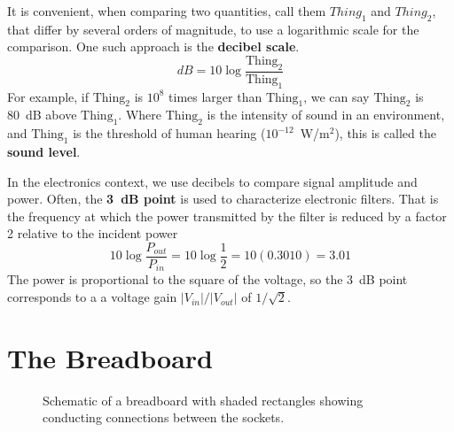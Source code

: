 \documentclass[11pt]{article}
\begin{document}
It is convenient, when comparing two quantities, call them $Thing_1$ 
and $Thing_2$, that differ by several orders of magnitude, to use a
logarithmic scale for the comparison. One such approach is the
\textbf{decibel scale}.
\begin{equation}
  dB = 10 \log \frac{\mathrm{Thing_2}}{\mathrm{Thing_1}}
  \label{eq:db}
\end{equation}
For example, if $\mathrm{Thing_2}$ is $10^8$ times larger than
$\mathrm{Thing_1}$, we can say $\mathrm{Thing_2}$ is 80~dB above
$\mathrm{Thing_1}$. Where $\mathrm{Thing_2}$ is the intensity
of sound in an environment, and $\mathrm{Thing_1}$ is the threshold of
human hearing ($10^{-12}$~W/m$^2$), this is called the
\textbf{sound level}.

In the electronics  context, we use decibels to compare signal
amplitude and power. Often, the \textbf{3~dB point} is used to characterize 
electronic filters. That is the frequency at which the power
transmitted by the filter is reduced by a factor 2 relative to the
incident power 
\[
10 \log \frac{P_{out}}{P_{in}} = 10 \log \frac{1}{2} = 10 (0.3010) = 3.01
\]
The power is proportional to the square of the voltage, so the 3~dB
point corresponds to a a voltage gain $|V_{in}|/|V_{out}|$ of
$1/\sqrt{2}$. 

\section{The Breadboard}
\label{sec:breadboard}

\begin{figure}[ht]
  \begin{center}
    \caption{Schematic of a breadboard with shaded rectangles showing
      conducting connections between the sockets.}
    \label{fig:breadboard}
  \end{center}
\end{figure}
\end{document}
